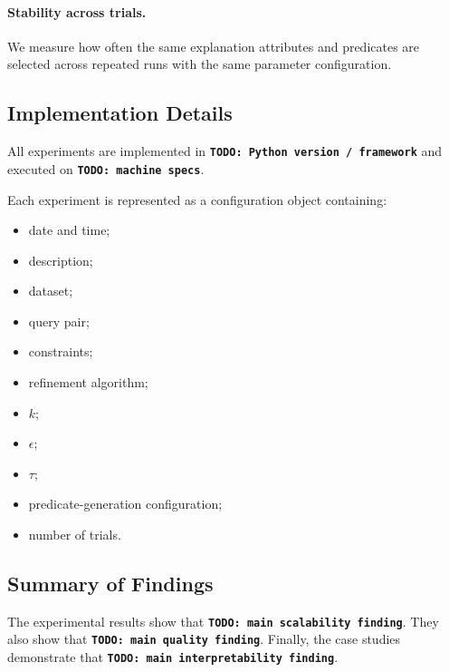 \paragraph{Stability across trials.}
We measure how often the same explanation attributes and predicates are selected
across repeated runs with the same parameter configuration.


\subsection{Implementation Details}
\label{subsec:implementation-details}

All experiments are implemented in \textbf{\texttt{TODO: Python version / framework}}
and executed on \textbf{\texttt{TODO: machine specs}}.

Each experiment is represented as a configuration object containing:
\begin{itemize}
    \item date and time;
    \item description;
    \item dataset;
    \item query pair;
    \item constraints;
    \item refinement algorithm;
    \item $k$;
    \item $\epsilon$;
    \item $\tau$;
    \item predicate-generation configuration;
    \item number of trials.
\end{itemize}


\subsection{Summary of Findings}
\label{subsec:experiments-summary}


The experimental results show that \textbf{\texttt{TODO: main scalability finding}}.
They also show that \textbf{\texttt{TODO: main quality finding}}. Finally, the case
studies demonstrate that \textbf{\texttt{TODO: main interpretability finding}}.
